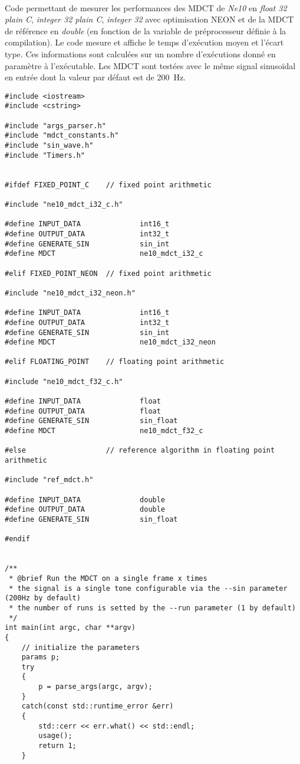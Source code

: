 \documentclass{article}
\begin{document}
\paragraph{}
Code permettant de mesurer les performances des MDCT de \emph{Ne10} en \emph{float 32 plain C}, \emph{integer 32 plain C}, \emph{integer 32} avec optimisation NEON et de la MDCT de référence en \emph{double} (en fonction de la variable de préprocesseur définie à la compilation). Le code mesure et affiche le temps d'exécution moyen et l'écart type. Ces informations sont calculées sur un nombre d'exécutions donné en paramètre à l'exécutable. Les MDCT sont testées avec le même signal sinusoïdal en entrée dont la valeur par défaut est de \SI{200}{\hertz}.
\lstset{language=C++}
\begin{lstlisting}
#include <iostream>
#include <cstring>

#include "args_parser.h"
#include "mdct_constants.h"
#include "sin_wave.h"
#include "Timers.h"


#ifdef FIXED_POINT_C    // fixed point arithmetic

#include "ne10_mdct_i32_c.h"

#define INPUT_DATA              int16_t
#define OUTPUT_DATA             int32_t
#define GENERATE_SIN            sin_int
#define MDCT                    ne10_mdct_i32_c

#elif FIXED_POINT_NEON  // fixed point arithmetic

#include "ne10_mdct_i32_neon.h"

#define INPUT_DATA              int16_t
#define OUTPUT_DATA             int32_t
#define GENERATE_SIN            sin_int
#define MDCT                    ne10_mdct_i32_neon

#elif FLOATING_POINT    // floating point arithmetic

#include "ne10_mdct_f32_c.h"

#define INPUT_DATA              float
#define OUTPUT_DATA             float
#define GENERATE_SIN            sin_float
#define MDCT                    ne10_mdct_f32_c

#else                   // reference algorithm in floating point arithmetic

#include "ref_mdct.h"

#define INPUT_DATA              double
#define OUTPUT_DATA             double
#define GENERATE_SIN            sin_float

#endif


/**
 * @brief Run the MDCT on a single frame x times
 * the signal is a single tone configurable via the --sin parameter (200Hz by default)
 * the number of runs is setted by the --run parameter (1 by default)
 */
int main(int argc, char **argv)
{
    // initialize the parameters
    params p;
    try
    {
        p = parse_args(argc, argv);
    }
    catch(const std::runtime_error &err)
    {
        std::cerr << err.what() << std::endl;
        usage();
        return 1;
    }


\end{lstlisting}
\end{document}

